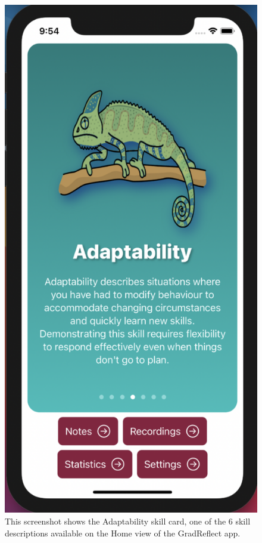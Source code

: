 \documentclass{l4proj}
\begin{document}
\begin{figure}
    \centering
    \includegraphics[scale=0.4]{images/AdaptabilitySkillCard.pdf}    
    \caption{This screenshot shows the Adaptability skill card, one of the 6 skill descriptions available on the Home view of the GradReflect app.}
    \label{fig:AdaptabilitySkillCard} 
\end{figure}
\end{document}
